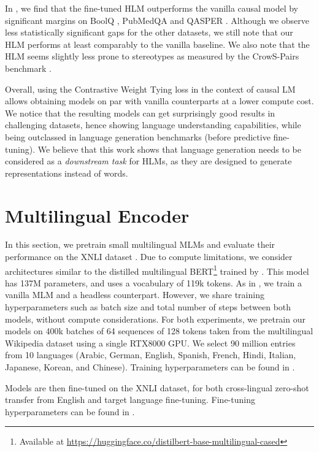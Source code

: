 In , we find that the fine-tuned HLM outperforms the vanilla causal model by significant margins on BoolQ \citep{clark-etal-2019-boolq}, PubMedQA \citep{jin-etal-2019-pubmedqa} and QASPER \citep{dasigi-etal-2021-dataset}. Although we observe less statistically significant gaps for the other datasets, we still note that our HLM performs at least comparably to the vanilla baseline.
%
We also note that the HLM seems slightly less prone to stereotypes as measured by the CrowS-Pairs benchmark \citep{nangia-etal-2020-crows}.

Overall, using the Contrastive Weight Tying loss in the context of causal LM allows obtaining models on par with vanilla counterparts at a lower compute cost. We notice that the resulting models can get surprisingly good results in challenging datasets, hence showing language understanding capabilities, while being outclassed in language generation benchmarks (before predictive fine-tuning). We believe that this work shows that language generation needs to be considered as a \textit{downstream task} for HLMs, as they are designed to generate representations instead of words.

\section{Multilingual Encoder}
\label{sec:multi_mlm}
In this section, we pretrain small multilingual MLMs and evaluate their performance on the XNLI dataset \citep{conneau2018xnli}. 
%
Due to compute limitations, we consider architectures similar to the distilled multilingual BERT\footnote{Available at \url{https://huggingface.co/distilbert-base-multilingual-cased}} trained by \citet{sanh2019distilbert}. This model has 137M parameters, and uses a vocabulary of 119k tokens. As in , we train a vanilla MLM and a headless counterpart. However, we share training hyperparameters such as batch size and total number of steps between both models, without compute considerations. For both experiments, we pretrain our models on 400k batches of 64 sequences of 128 tokens taken from the multilingual Wikipedia dataset using a single RTX8000 GPU. We select 90 million entries from 10 languages (Arabic, German, English, Spanish, French, Hindi, Italian, Japanese, Korean, and Chinese). Training hyperparameters can be found in .

Models are then fine-tuned on the XNLI dataset, for both cross-lingual zero-shot transfer from English and target language fine-tuning. Fine-tuning hyperparameters can be found in .


